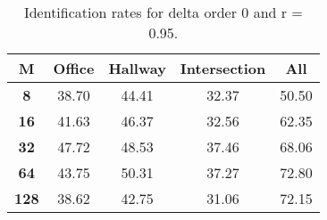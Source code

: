 \begin{table}[h]
    \small
    \centering
    \begin{tabular}{|c|c|c|c|l|}    
    \hline
    {\bf M} & {\bf Office} & {\bf Hallway} & {\bf Intersection} &     \multicolumn{1}{c|}{{\bf All}} \\ \hline
    {\bf 8} & 38.70 & 44.41 & 32.37 & 50.50 \\ \hline
    {\bf 16} & 41.63 & 46.37 & 32.56 & 62.35 \\ \hline
    {\bf 32} & 47.72 & 48.53 & 37.46 & 68.06 \\ \hline
    {\bf 64} & 43.75 & 50.31 & 37.27 & 72.80 \\ \hline
    {\bf 128} & 38.62 & 42.75 & 31.06 & 72.15 \\ \hline
    \end{tabular}
    \caption{Identification rates for delta order 0 and r = 0.95.}    
    \label{tab:identify_speakers_0.95_mit_19_0}
\end{table}
